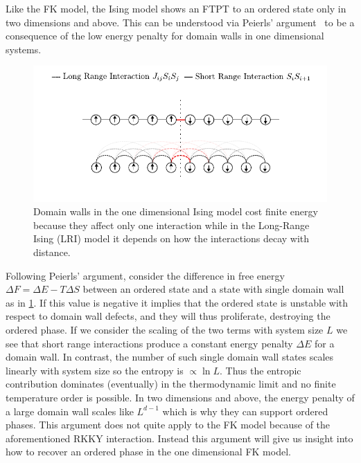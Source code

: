 Like the FK model, the Ising model shows an FTPT to an ordered state only in two dimensions and above. This can be understood via Peierls' argument~\autocite{peierlsIsingModelFerromagnetism1936,kennedyItinerantElectronModel1986} to be a consequence of the low energy penalty for domain walls in one dimensional systems.

\hypertarget{fig:ising_model_domain_wall}{%
\begin{figure}
\centering
\includegraphics[width=1\textwidth,height=\textheight]{figure_code/intro_chapter/ising_model_domain_wall}
\caption[{Domain walls in the long-range Ising Model}]{Domain walls in the one dimensional Ising model cost finite energy because they affect only one interaction while in the Long-Range Ising (LRI) model it depends on how the interactions decay with distance.}
\label{fig:ising_model_domain_wall}
\end{figure}
}

Following Peierls' argument, consider the difference in free energy \(\Delta F = \Delta E - T\Delta S\) between an ordered state and a state with single domain wall as in \cref{fig:ising_model_domain_wall}. If this value is negative it implies that the ordered state is unstable with respect to domain wall defects, and they will thus proliferate, destroying the ordered phase. If we consider the scaling of the two terms with system size \(L\) we see that short range interactions produce a constant energy penalty \(\Delta E\) for a domain wall. In contrast, the number of such single domain wall states scales linearly with system size so the entropy is \(\propto \ln L\). Thus the entropic contribution dominates (eventually) in the thermodynamic limit and no finite temperature order is possible. In two dimensions and above, the energy penalty of a large domain wall scales like \(L^{d-1}\) which is why they can support ordered phases. This argument does not quite apply to the FK model because of the aforementioned RKKY interaction. Instead this argument will give us insight into how to recover an ordered phase in the one dimensional FK model.

